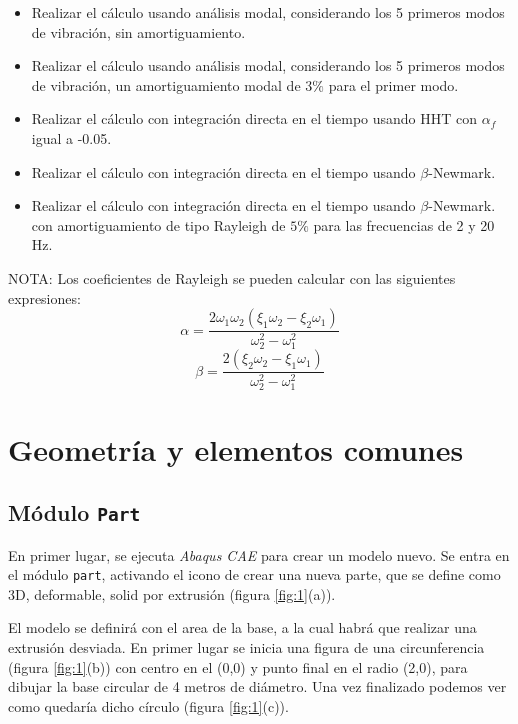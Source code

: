 \documentclass[spanish,a4paper,12pt]{article}
\begin{document}
\begin{itemize}
    \item Realizar el cálculo usando análisis modal, considerando los 5 primeros modos de vibración, sin amortiguamiento.
    \item Realizar el cálculo usando análisis modal, considerando los 5 primeros modos de vibración, un amortiguamiento modal de $3 \%$ para el primer modo.
    \item Realizar el cálculo con integración directa en el tiempo usando HHT con $\alpha_f$ igual a -0.05. 
    \item Realizar el cálculo con integración directa en el tiempo usando $\beta$-Newmark.
    \item Realizar el cálculo con integración directa en el tiempo usando $\beta$-Newmark.
    con amortiguamiento de tipo Rayleigh de $5 \%$ para las frecuencias de 2 y 20 Hz. 
\end{itemize}

\vspace{10mm}
NOTA: Los coeficientes de Rayleigh se pueden calcular con las siguientes expresiones:
$$
\alpha=\frac{2\omega_1\omega_2 (\xi_1\omega_2-\xi_2\omega_1)}{\omega_2^2-\omega_1^2}
$$
$$
\beta=\frac{2 (\xi_2\omega_2-\xi_1\omega_1)}{\omega_2^2-\omega_1^2}
$$


\section{Geometrí­a y elementos comunes}
\label{sec:guia}

\subsection{Módulo \texttt{Part}}

En primer lugar, se ejecuta \emph{Abaqus CAE} para crear un modelo nuevo. Se entra en el módulo \texttt{part}, activando el icono de crear una nueva parte, que se define como 3D, deformable, solid por extrusión (figura \ref{fig:1}(a)).

El modelo se definirá con el area de la base, a la cual habrá que realizar una extrusión desviada. En primer lugar se inicia una figura de una circunferencia (figura \ref{fig:1}(b)) con centro en el (0,0) y punto final en el radio (2,0), para dibujar la base circular de 4 metros de diámetro. Una vez finalizado podemos ver como quedarí­a dicho cí­rculo (figura \ref{fig:1}(c)).
\end{document}
